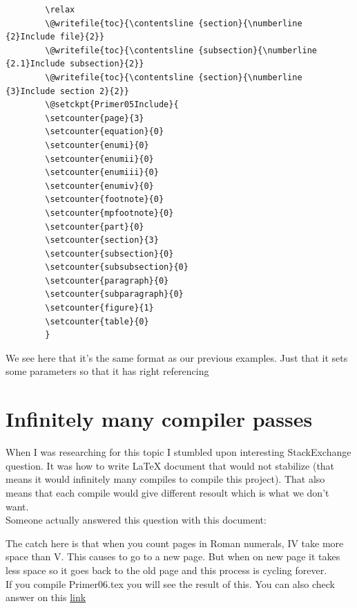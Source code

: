 \documentclass[a4paper,oneside,8pt]{extarticle}
\newcommand{\latex}{\LaTeX\xspace}
\begin{document}
\begin{markdown-block}
    \begin{verbatim}
        \relax 
        \@writefile{toc}{\contentsline {section}{\numberline {2}Include file}{2}}
        \@writefile{toc}{\contentsline {subsection}{\numberline {2.1}Include subsection}{2}}
        \@writefile{toc}{\contentsline {section}{\numberline {3}Include section 2}{2}}
        \@setckpt{Primer05Include}{
        \setcounter{page}{3}
        \setcounter{equation}{0}
        \setcounter{enumi}{0}
        \setcounter{enumii}{0}
        \setcounter{enumiii}{0}
        \setcounter{enumiv}{0}
        \setcounter{footnote}{0}
        \setcounter{mpfootnote}{0}
        \setcounter{part}{0}
        \setcounter{section}{3}
        \setcounter{subsection}{0}
        \setcounter{subsubsection}{0}
        \setcounter{paragraph}{0}
        \setcounter{subparagraph}{0}
        \setcounter{figure}{1}
        \setcounter{table}{0}
        }
    \end{verbatim}
\end{markdown-block}

We see here that it's the same format as our previous examples. Just that it sets some parameters so that it has right referencing

\section{Infinitely many compiler passes}
When I was researching for this topic I stumbled upon interesting StackExchange question. It was how to write \latex document that would not stabilize (that means it would infinitely many compiles to compile this project). That also means that each compile would give different resoult which is what we don't want.\\
Someone actually answered this question with this document:

\begin{markdown-block}
    
\end{markdown-block}

The catch here is that when you count pages in Roman numerals, IV take more space than V. This causes to go to a new page. But when on new page it takes less space so it goes back to the old page and this process is cycling forever.\\

If you compile Primer06.tex you will see the result of this. You can also check answer on this \href{https://tex.stackexchange.com/questions/30674/document-requiring-infinitely-many-compiler-passes}{link} \cite{infinitely}
\end{document}
